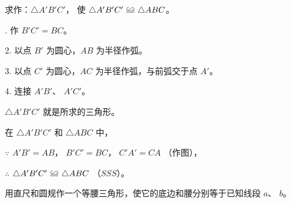 求作：$\triangle A'B'C'$， 使 $\triangle A'B'C' \quandeng \triangle ABC$。

. 作 $B'C' = BC$。

2. 以点 $B'$ 为圆心，$AB$ 为半径作弧。

3. 以点 $C'$ 为圆心，$AC$ 为半径作弧，与前弧交于点 $A'$。

4. 连接 $A'B'$、 $A'C'$。

$\triangle A'B'C'$ 就是所求的三角形。

\zhengming 在 $\triangle A'B'C'$ 和 $\triangle ABC$ 中，

$\because$ \quad $A'B' = AB$， $B'C' = BC$， $C'A' = CA$ （作图），

$\therefore$ \quad $\triangle A'B'C' \quandeng \triangle ABC$ （$SSS$）。


\begin{lianxi}

用直尺和圆规作一个等腰三角形，使它的底边和腰分别等于已知线段 $a$、 $b$。

\begin{figure}[htbp]
    \centering
    
\end{figure}

\end{lianxi}

